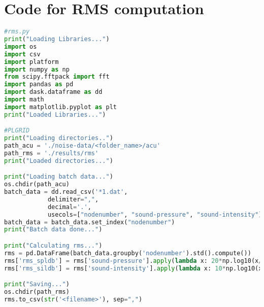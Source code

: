 \chapter{Code for RMS computation} %

\label{rms_code} %

\begin{lstlisting}[language=Python]
#rms.py
print("Loading Libraries...")
import os
import csv
import platform
import numpy as np
from scipy.fftpack import fft
import pandas as pd
import dask.dataframe as dd
import math
import matplotlib.pyplot as plt
print("Loaded Libraries...")

#PLGRID
print("Loading directories..")
path_acu = './noise-data/<folder_name>/acu'
path_rms = './results/rms'
print("Loaded directories...")

print("Loading batch data...")
os.chdir(path_acu)
batch_data = dd.read_csv('*1.dat',
			delimiter=",",
			decimal='.',
			usecols=["nodenumber", "sound-pressure", "sound-intensity"])
batch_data = batch_data.set_index("nodenumber")
print("Batch data done...")

print("Calculating rms...")
rms = pd.DataFrame(batch_data.groupby('nodenumber').std().compute())
rms['rms_spldb'] = rms['sound-pressure'].apply(lambda x: 20*np.log10(x/0.00002))
rms['rms_sildb'] = rms['sound-intensity'].apply(lambda x: 10*np.log10(x/1e-12))

print("Saving...")
os.chdir(path_rms)
rms.to_csv(str('<filename>'), sep=",")
\end{lstlisting}